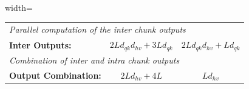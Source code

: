 \documentclass{article}
\begin{document}
\begin{table}[htbp]
\begin{adjustbox}{width=\textwidth}
\begin{tabular}{lcc}
            \midrule
            \multicolumn{3}{l}{\textit{Parallel computation of the inter chunk outputs}}                                                                                                  \\
            \textbf{Inter Outputs:}           & $2L d_{qk} d_{hv} + 3 L d_{qk}$                                     & $2L d_{qk} d_{hv} + L d_{qk}$                                       \\
            \midrule
            \multicolumn{3}{l}{\textit{Combination of inter and intra chunk outputs}}                                                                                                     \\
            \textbf{Output Combination:}      & $2 L d_{hv} + 4L$                                                   & $L d_{hv}$                                                          \\
            \bottomrule
        \end{tabular}
        \end{adjustbox}
        \vspace{-0.2cm}
    \end{table}
\end{document}
